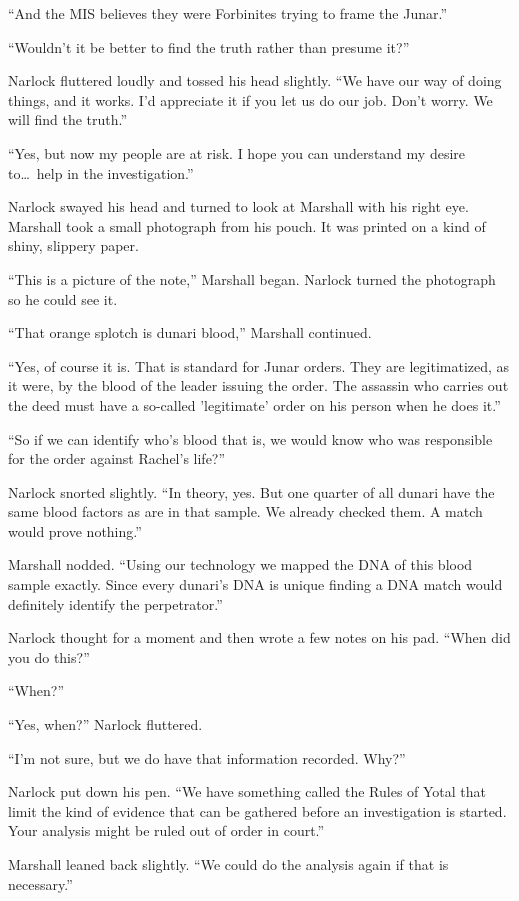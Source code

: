 ``And the MIS believes they were Forbinites trying to frame the Junar.''

``Wouldn't it be better to find the truth rather than presume it?''

Narlock fluttered loudly and tossed his head slightly. ``We have our way of doing things, and it
works. I'd appreciate it if you let us do our job. Don't worry. We will find the truth.''

``Yes, but now my people are at risk. I hope you can understand my desire to\ldots\ help in the
investigation.''

Narlock swayed his head and turned to look at Marshall with his right eye. Marshall took a small
photograph from his pouch. It was printed on a kind of shiny, slippery paper.

``This is a picture of the note,'' Marshall began. Narlock turned the photograph so he could see
it.

``That orange splotch is dunari blood,'' Marshall continued.

``Yes, of course it is. That is standard for Junar orders. They are legitimatized, as it were,
by the blood of the leader issuing the order. The assassin who carries out the deed must have a
so-called 'legitimate' order on his person when he does it.''

``So if we can identify who's blood that is, we would know who was responsible for the order
against Rachel's life?''

Narlock snorted slightly. ``In theory, yes. But one quarter of all dunari have the same blood
factors as are in that sample. We already checked them. A match would prove nothing.''

Marshall nodded. ``Using our technology we mapped the DNA of this blood sample exactly. Since
every dunari's DNA is unique finding a DNA match would definitely identify the perpetrator.''

Narlock thought for a moment and then wrote a few notes on his pad. ``When did you do this?''

``When?''

``Yes, when?'' Narlock fluttered.

``I'm not sure, but we do have that information recorded. Why?''

Narlock put down his pen. ``We have something called the Rules of Yotal that limit the kind of
evidence that can be gathered before an investigation is started. Your analysis might be ruled
out of order in court.''

Marshall leaned back slightly. ``We could do the analysis again if that is necessary.''

